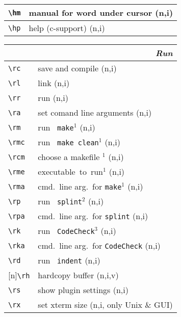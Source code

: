 \documentclass[oneside,11pt,landscape,DIV17]{scrartcl}
\newcommand{\Rep}{{\tiny{[n]}}}
\begin{document}
\begin{multicols}{3}
\begin{center}
\begin{tabular}[]{|p{12mm}|p{60mm}|}
\hline \verb'\hm'   & manual for word under cursor  \hfill (n,i)\\
\hline \verb'\hp'   & help (c-support) \hfill (n,i)\\
\hline
\end{tabular}
\vspace{100mm}
\begin{tabular}[]{|p{12mm}|p{58mm}|}
\hline
\multicolumn{2}{|r|}{\textsl{\textbf{R}un}} \\
\hline \verb'\rc'  & save and compile                        \hfill (n,i)\\
\hline \verb'\rl'  & link                                    \hfill (n,i)\\
\hline \verb'\rr'  & run                                     \hfill (n,i)\\
\hline \verb'\ra'  & set comand line arguments               \hfill (n,i)\\
\hline \verb'\rm'  & run \texttt{ make}$^1$                      \hfill (n,i)\\
\hline \verb'\rmc' & run \texttt{ make clean}$^1$                \hfill (n,i)\\
\hline \verb'\rcm' & choose a makefile $^1$                \hfill (n,i)\\
\hline \verb'\rme' & executable\ to\ run$^1$                     \hfill (n,i)\\
\hline \verb'\rma' & cmd.\ line arg.\ for \texttt{make}$^1$      \hfill (n,i)\\
%
\hline \verb'\rp'  & run \texttt{ splint}$^2$     \hfill (n,i)\\
\hline \verb'\rpa' & cmd.\ line arg.\ for \texttt{splint}    \hfill (n,i)\\
%
\hline \verb'\rk'  & run \texttt{ CodeCheck}$^3$  \hfill (n,i)\\
\hline \verb'\rka' & cmd.\ line arg.\ for \texttt{CodeCheck} \hfill (n,i)\\
%
\hline \verb'\rd'  & run \texttt{ indent}         \hfill (n,i)\\
\hline \Rep\verb'\rh'  & hardcopy buffer             \hfill (n,i,v)\\
\hline \verb'\rs'  & show plugin settings        \hfill (n,i)\\
\hline \verb'\rx'  & set xterm size              \hfill (n,i, only Unix \& GUI)\\

\end{tabular}
\end{center}
\end{multicols}
\end{document}
